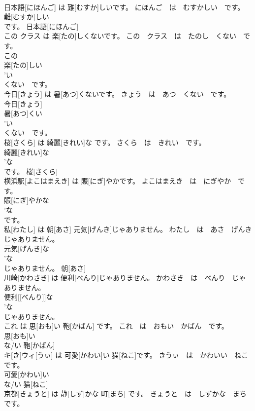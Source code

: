 \documentclass[8pt]{extreport}
\begin{document}
\begin{CJK}{UTF8}{min}
\\	日本語[にほんご] は 難[むすか]しいです。	にほんご　は　むすかしい　です。	
\\	難[むすか]しい 
\\	です。	日本語[にほんご] 
\\	この クラス は 楽[たの]しくないです。	この　クラス　は　たのし　くない　です。	
\\	この 
\\	楽[たの]しい 
\\	'い
\\	くない　です。			
\\	今日[きょう] は 暑[あつ]くないです。	きょう　は　あつ　くない　です。	
\\	今日[きょう] 
\\	暑[あつ]くい 
\\	'い
\\	くない　です。			
\\	桜[さくら] は 綺麗[きれい]な です。	さくら　は　きれい　です。	
\\	綺麗[きれい]な 
\\	'な
\\	です。	桜[さくら] 
\\	横浜駅[よこはまえき] は 賑[にぎ]やかです。	よこはまえき　は　にぎやか　です。	
\\	賑[にぎ]やかな 
\\	'な
\\	です。				
\\	私[わたし] は 朝[あさ] 元気[げんき]じゃありません。	わたし　は　あさ　げんき　じゃありません。	
\\	元気[げんき]な 
\\	'な
\\	じゃありません。	朝[あさ] 
\\	川崎[かわさき] は 便利[べんり]じゃありません。	かわさき　は　べんり　じゃありません。	
\\	便利[[べんり]]な 
\\	'な
\\	じゃありません。				
\\	これ は 思[おも]い 鞄[かばん] です。	これ　は　おもい　かばん　です。	
\\	思[おも]い 
\\	な/い	鞄[かばん] 
\\	キ[き]ウィ[うぃ] は 可愛[かわい]い 猫[ねこ]です。	きうぃ　は　かわいい　ねこ　です。	
\\	可愛[かわい]い 
\\	な/い	猫[ねこ] 
\\	京都[きょうと] は 静[しず]かな 町[まち] です。	きょうと　は　しずかな　まち　です。	

\end{CJK}
\end{document}
